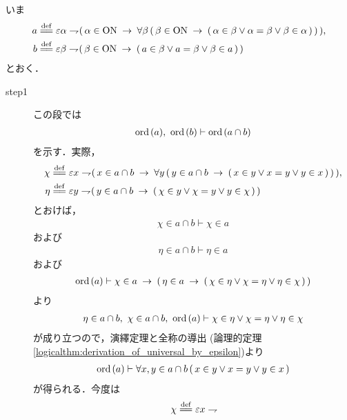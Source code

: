 	\begin{sketch}
		いま
		\begin{align}
			a &\defeq \varepsilon \alpha \negation 
			(\, \alpha \in \ON \rarrow \forall \beta\, (\, \beta \in \ON \rarrow 
			(\, \alpha \in \beta \vee \alpha = \beta \vee \beta \in \alpha\, )\,) \,), \\
			b &\defeq \varepsilon \beta \negation (\, \beta \in \ON \rarrow 
			(\, a \in \beta \vee a = \beta \vee \beta \in a\, )\,)
		\end{align}
		とおく．
		\begin{description}
			\item[step1] この段では
				\begin{align}
					\operatorname*{ord}\hspace{0.15em}(a),\ \operatorname*{ord}\hspace{0.15em}(b) \vdash \operatorname*{ord}\hspace{0.15em}(a \cap b)
					\label{fom:ON_is_totally_ordered_1}
				\end{align}
				を示す．実際，
				\begin{align}
					\chi &\defeq \varepsilon x \negation 
					(\, x \in a \cap b \rarrow \forall y\, (\, 
					y \in a \cap b \rarrow (\, x \in y \vee x = y \vee y \in x\, )\, )\, ), \\
					\eta &\defeq \varepsilon y \negation (\, 
					y \in a \cap b \rarrow (\, \chi \in y \vee \chi = y \vee y \in \chi\, )\, )
				\end{align}
				とおけば，
				\begin{align}
					\chi \in a \cap b \vdash \chi \in a
				\end{align}
				および
				\begin{align}
					\eta \in a \cap b \vdash \eta \in a
				\end{align}
				および
				\begin{align}
					\operatorname*{ord}\hspace{0.15em}(a) \vdash \chi \in a \hspace{0.25em}\rightarrow\hspace{0.25em} (\, 
					\eta \in a \hspace{0.25em}\rightarrow\hspace{0.25em} (\, \chi \in \eta \vee \chi = \eta \vee \eta \in \chi\, )\, )
				\end{align}
				より
				\begin{align}
					\eta \in a \cap b,\ \chi \in a \cap b,\ \operatorname*{ord}\hspace{0.15em}(a) 
					\vdash \chi \in \eta \vee \chi = \eta \vee \eta \in \chi
				\end{align}
				が成り立つので，演繹定理と全称の導出
				(論理的定理\ref{logicalthm:derivation_of_universal_by_epsilon})より
				\begin{align}
					\operatorname*{ord}\hspace{0.15em}(a) \vdash \forall x,y \in a \cap b\, 
					(\, x \in y \vee x = y \vee y \in x\, )
				\end{align}
				が得られる．今度は
				\begin{align}
					\chi \defeq \varepsilon x \negation 

\end{align}
\end{description}
\end{sketch}
